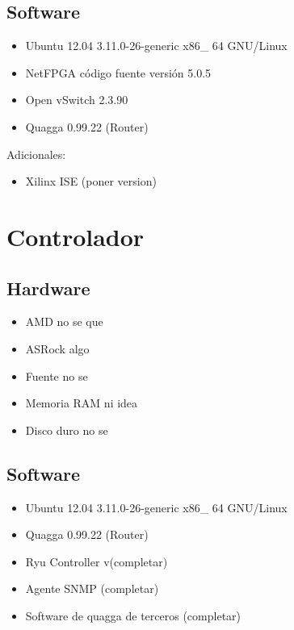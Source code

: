 \subsection{Software}

\begin{itemize}
\item Ubuntu 12.04 3.11.0-26-generic x86\_ 64 GNU/Linux
\item NetFPGA c\'odigo fuente versi\'on 5.0.5
\item Open vSwitch 2.3.90
\item Quagga 0.99.22 (Router)
\end{itemize}

Adicionales:
\begin{itemize}
\item Xilinx ISE (poner version)
\end{itemize}

\section{Controlador}

\subsection{Hardware}
\begin{itemize}
\item AMD no se que
\item ASRock algo
\item Fuente no se
\item Memoria RAM ni idea
\item Disco duro no se
\end{itemize}


\subsection{Software}
\begin{itemize}
\item Ubuntu 12.04 3.11.0-26-generic x86\_ 64 GNU/Linux
\item Quagga 0.99.22 (Router)
\item Ryu Controller v(completar)
\item Agente SNMP (completar)
\item Software de quagga de terceros (completar)
\end{itemize}
